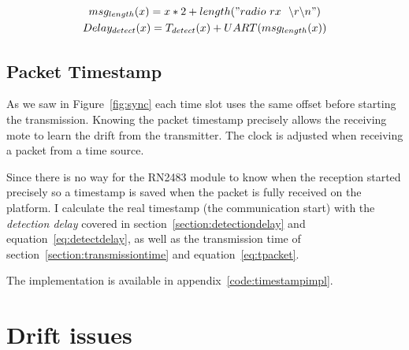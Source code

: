 \begin{gather}
  msg_{length}(x) = x * 2 + length("radio~rx~~\backslash r \backslash n") \\
  \label{eq:detectdelay}
  Delay_{detect}(x) = T_{detect}(x) + UART(msg_{length}(x))
\end{gather}

\subsection{Packet Timestamp}

As we saw in Figure~\ref{fig:sync} each time slot uses the same offset before
starting the transmission.
Knowing the packet timestamp precisely allows the receiving mote to learn the
drift from the transmitter.
The clock is adjusted when receiving a packet from a time source.

Since there is no way for the RN2483 module to know when the reception started
precisely so a timestamp is saved when the packet is fully received on
the platform.
I calculate the real timestamp (the communication start) with the
\emph{detection delay} covered in section~\ref{section:detectiondelay} and
equation~\ref{eq:detectdelay}, as well as the transmission time of
section~\ref{section:transmissiontime} and equation~\ref{eq:tpacket}.

The implementation is available in appendix~\ref{code:timestampimpl}.




\section{Drift issues\label{section:driftissues}}

